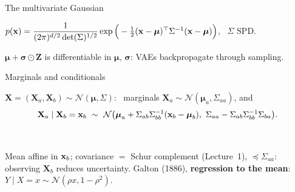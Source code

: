 \documentclass[aspectratio=1610,11pt]{beamer}
\begin{document}
\begin{frame}{The multivariate Gaussian}
    \begin{definition}
        \small \(p(\mathbf{x}) = \dfrac{1}{(2\pi)^{d/2}\det(\Sigma)^{1/2}}\exp\Big(-\frac{1}{2}(\mathbf{x} - \boldsymbol{\mu})^\top\Sigma^{-1}(\mathbf{x} - \boldsymbol{\mu})\Big)\), \ $\Sigma$ SPD.
    \end{definition}
    \begin{remark}
        \small $\boldsymbol{\mu} + \boldsymbol{\sigma} \odot \mathbf{Z}$ is differentiable in $\boldsymbol{\mu}$, $\boldsymbol{\sigma}$: VAEs backpropagate through sampling.
    \end{remark}
\end{frame}


\begin{frame}{Marginals and conditionals}
    \begin{theorem}
        \small $\mathbf{X} = (\mathbf{X}_a, \mathbf{X}_b) \sim \mathcal{N}(\boldsymbol{\mu}, \Sigma)$: \ marginals $\mathbf{X}_a \sim \mathcal{N}(\boldsymbol{\mu}_a, \Sigma_{aa})$, and
        \[\mathbf{X}_a \mid \mathbf{X}_b = \mathbf{x}_b \ \sim\ \mathcal{N}\big(\boldsymbol{\mu}_a + \Sigma_{ab}\Sigma_{bb}^{-1}(\mathbf{x}_b - \boldsymbol{\mu}_b),\ \Sigma_{aa} - \Sigma_{ab}\Sigma_{bb}^{-1}\Sigma_{ba}\big).\]
    \end{theorem}
    \centering{}
    \\[0.1em]
    \raggedright\small
    Mean affine in $\mathbf{x}_b$; covariance $=$ Schur complement (Lecture~1), $\preceq \Sigma_{aa}$: observing $\mathbf{X}_b$ reduces uncertainty. Galton (1886), \textbf{regression to the mean}: $Y \mid X = x \sim \mathcal{N}(\rho x, 1 - \rho^2)$.
\end{frame}
\end{document}
